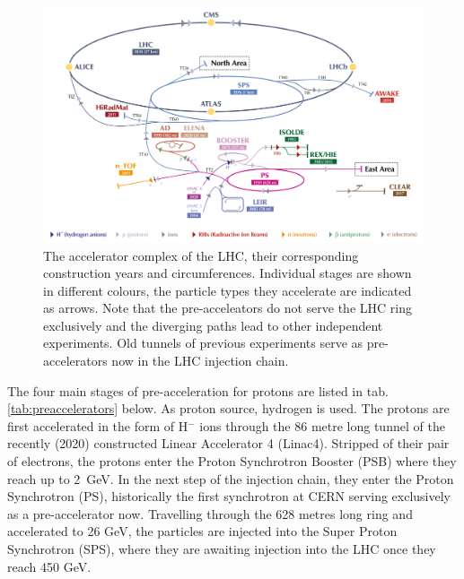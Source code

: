 \begin{figure}[h!]
	\centering
	\includegraphics[width=0.8\linewidth]{figures/experiment/CCC-v2019-final-white_cut}
	\caption{The accelerator complex of the LHC, their corresponding construction years and circumferences. Individual stages are shown in different colours, the particle types they accelerate are indicated as arrows. Note that the pre-acceleators do not serve the LHC ring exclusively and the diverging paths lead to other independent experiments. Old tunnels of previous experiments serve as pre-accelerators now in the LHC injection chain. \cite{Mobs:2684277}}
	\label{fig:lhcstructure}
\end{figure}

The four main stages of pre-acceleration for protons are listed in tab. \ref{tab:preaccelerators} below. As proton source, hydrogen is used. The protons are first accelerated in the form of H$^-$ ions through the 86 metre long tunnel of the recently (2020) constructed Linear Accelerator 4 (Linac4). Stripped of their pair of electrons, the protons enter the Proton Synchrotron Booster (PSB) where they reach up to \SI{2}{\giga\electronvolt}. In the next step of the injection chain, they enter the Proton Synchrotron (PS), historically the first synchrotron at CERN serving exclusively as a pre-accelerator now. Travelling through the 628 metres long ring and accelerated to 26 GeV, the particles are injected into the Super Proton Synchrotron (SPS), where they are awaiting injection into the LHC once they reach 450 GeV.


